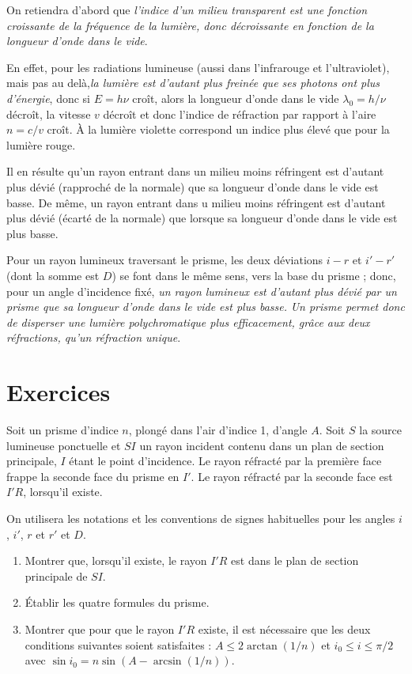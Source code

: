 On retiendra d'abord que \emph{l'indice d'un milieu transparent est une fonction croissante de la fréquence de la lumière, donc décroissante en fonction de la longueur d'onde dans le vide}.

En effet, pour les radiations lumineuse (aussi dans l'infrarouge et l'ultraviolet), mais pas au delà,\emph{la lumière est d'autant plus freinée que ses photons ont plus d'énergie}, donc si $E=h \nu$ croît, alors la longueur d'onde dans le vide $\lambda_0 = h/\nu$ décroît, la vitesse $v$ décroît et donc l'indice de réfraction par rapport à l'aire $n=c/v$ croît. À la lumière violette correspond un indice plus élevé que pour la lumière rouge.

Il en résulte qu'un rayon entrant dans un milieu moins réfringent est d'autant plus dévié (rapproché de la normale) que sa longueur d'onde dans le vide est basse. De même, un rayon entrant dans u milieu moins réfringent est d'autant plus dévié (écarté de la normale) que lorsque sa longueur d'onde dans le vide est plus basse.

Pour un rayon lumineux traversant le prisme, les deux déviations $i-r$ et $i'-r'$ (dont la somme est $D$) se font dans le même sens, vers la base du prisme ; donc, pour un angle d'incidence fixé, \emph{un rayon lumineux est d'autant plus dévié par un prisme que sa longueur d'onde dans le vide est plus basse.}
\emph{Un prisme permet donc de disperser une lumière polychromatique plus efficacement, grâce aux deux réfractions, qu'un réfraction unique}.

\section{Exercices}

\begin{exercice}
	Soit un prisme d'indice $n$, plongé dans l'air d'indice 1, d'angle $A$.
	Soit $S$ la source lumineuse ponctuelle et $SI$ un rayon incident contenu dans un plan de section principale, $I$ étant le point d'incidence. Le rayon réfracté par la première face frappe la seconde face du prisme en $I'$. Le rayon réfracté par la seconde face est $I'R$, lorsqu'il existe.

	On utilisera les notations et les conventions de signes habituelles pour les angles $i$, $i'$, $r$ et $r'$ et $D$.
	\begin{enumerate}
\item Montrer que, lorsqu'il existe, le rayon $I'R$ est dans le plan de section principale de $SI$.
\item Établir les quatre formules du prisme.
\item Montrer que pour que le rayon $I'R$ existe, il est nécessaire que les deux conditions suivantes soient satisfaites : $A \leq 2 \arctan(1/n)$ et $i_0 \leq i \leq \pi/2$ avec $\sin i_0 = n \sin\left(A-\arcsin(1/n)\right)$.
	\end{enumerate}
\end{exercice}

